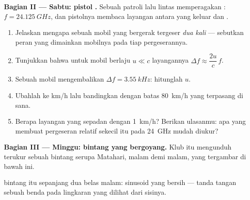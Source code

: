 \begin{problem}
\medskip
\noindent\textbf{Bagian II --- Sabtu: pistol .}
Sebuah patroli lalu lintas memperagakan : $f = \qty{24.125}{GHz}$, dan pistolnya
membaca layangan antara  yang keluar dan .
\begin{enumerate}[resume]
  \item Jelaskan mengapa  sebuah mobil yang bergerak tergeser \emph{dua kali} ---
        sebutkan peran yang dimainkan mobilnya pada tiap pergeserannya.
  \item Tunjukkan bahwa untuk mobil berlaju $u \ll c$ layangannya
        $\Delta f \approx \dfrac{2u}{c}\,f$.
  \item Sebuah mobil mengembalikan $\Delta f = \qty{3.55}{kHz}$: hitunglah $u$.
  \item Ubahlah ke \unit{km/h} lalu bandingkan dengan batas \qty{80}{km/h} yang terpasang
        di sana.
  \item Berapa  layangan yang sepadan dengan \qty{1}{km/h}? Berikan ulasanmu: apa yang
        membuat pergeseran relatif sekecil itu pada  \qty{24}{GHz} mudah diukur?
\end{enumerate}

\medskip
\noindent\textbf{Bagian III --- Minggu: bintang yang bergoyang.}
Klub itu mengunduh  terukur sebuah bintang serupa Matahari, malam demi
malam, yang tergambar di bawah ini.

\begin{omfigure}

{\small {} bintang itu sepanjang dua belas malam: sinusoid yang bersih ---
tanda tangan sebuah benda pada  lingkaran yang dilihat dari sisinya.}
\end{omfigure}


\end{problem}
